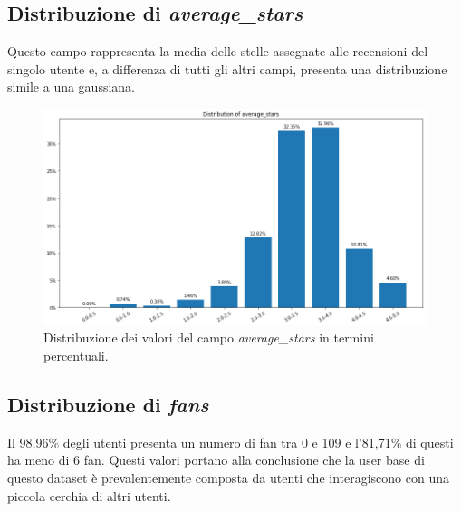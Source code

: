 \documentclass[12pt]{article}
\begin{document}
\subsection{Distribuzione di \textit{average\_stars}}
Questo campo rappresenta la media delle stelle assegnate alle recensioni del singolo utente e, a differenza di tutti gli altri campi, presenta una distribuzione simile a una gaussiana.
\begin{figure}[H]
\centering
\includegraphics[width=\textwidth]{images/average_stars_distribution.png}
\caption{Distribuzione dei valori del campo \textit{average\_stars} in termini percentuali.}
\end{figure}

\subsection{Distribuzione di \textit{fans}}
Il 98,96\% degli utenti presenta un numero di fan tra 0 e 109 e l'81,71\% di questi ha meno di 6 fan. Questi valori portano alla conclusione che la user base di questo dataset è prevalentemente composta da utenti che interagiscono con una piccola cerchia di altri utenti.
\end{document}
